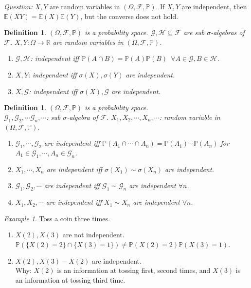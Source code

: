 \documentclass[12pt]{report}
\renewcommand{\P}{\mathbb{P}}
\newcommand{\F}{\mathcal{F}}
\renewcommand{\1}{\mathbb{1}}
\renewcommand{\O}{\Omega}
\renewcommand{\subset}{\subseteq}
\theoremstyle{break}
\theoremstyle{newdef}
\newtheorem{defn}[thm]{Definition} %
\theoremstyle{remark}
\newtheorem*{exmp}{Example} %
\begin{document}
\textit{Question:} $X, Y$ are random variables in $(\Omega, \mathcal{F}, \mathbb{P})$.
If $X, Y$ are independent, then $\mathbb{E}(XY) = \mathbb{E}(X)\mathbb{E}(Y)$, but the converse does not hold.


\begin{defn}
$(\Omega, \mathcal{F}, \mathbb{P})$ is a probability space.
$\mathcal{G}, \mathcal{H} \subset \mathcal{F}$ are sub $\sigma$-algebras of $\mathcal{F}$.
$X, Y : \Omega \rightarrow \mathbb{R}$ are random variables in $(\Omega, \mathcal{F}, \mathbb{P})$.
\begin{enumerate}
\item $\mathcal{G}, \mathcal{H}$: independent iff $\P(A\cap B) = \P(A) \P(B) \enspace \forall A \in \mathcal{G}, B \in \mathcal{H}$.
\item $X, Y$: independent iff $\sigma(X), \sigma(Y)$ are independent.
\item $X, \mathcal{G}$: independent iff $\sigma(X), \mathcal{G}$ are independent.
\end{enumerate}
\end{defn}



\begin{defn}
$(\O, \F, \P)$ is a probability space.\\
$\mathcal{G}_1, \mathcal{G}_2, \cdots \mathcal{G}_n, \cdots$: sub $\sigma$-algebra of $\F$.
$X_1, X_2, \cdots, X_n, \cdots$: random variable in $(\O, \F, \P)$.
\begin{enumerate}
\item $\mathcal{G}_1, \cdots, \mathcal{G}_2$ are independent iff $\P(A_1 \cap \cdots \cap A_n) = \P(A_1) \cdots \P(A_n)$ for $A_1 \in \mathcal{G}_1, \cdots, A_n \in \mathcal{G}_n$.
\item $X_1, \cdots, X_n$ are independent iff $\sigma(X_1) \sim \sigma(X_n)$ are independent.
\item $\mathcal{G}_1, \mathcal{G}_2, \cdots$ are independent iff $\mathcal{G}_1 \sim \mathcal{G}_n$ are independent $\forall n$.
\item $X_1, X_2, \cdots$ are independent iff $X_1 \sim X_n$ are independent $\forall n$.
\end{enumerate}
\end{defn}

\begin{exmp}
Toss a coin three times.
\begin{enumerate}
\item $X(2), X(3)$ are not independent.\\
$\P(\{X(2) = 2\} \cap \{ X(3) = 1\}) \neq \P(X(2) = 2)\P(X(3)=1)$.
\item $X(2), X(3)-X(2)$ are independent.\\
Why: $X(2)$ is an information at tossing first, second times, and $X(3)$ is an information at tossing third time.
\end{enumerate}
\end{exmp}
\end{document}
